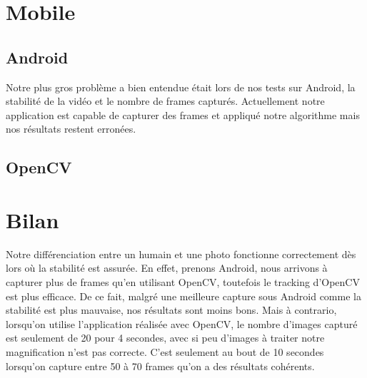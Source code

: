 \section{Mobile}

\subsection{Android}

Notre plus gros problème a bien entendue était lors de nos tests sur Android, la stabilité de la vidéo et le nombre de frames capturés.
Actuellement notre application est capable de capturer des frames et appliqué notre algorithme mais nos résultats restent erronées.

\subsection{OpenCV}


\section{Bilan}

Notre différenciation entre un humain et une photo fonctionne correctement dès lors où la stabilité est assurée. En effet, prenons Android, nous arrivons
à capturer plus de frames qu'en utilisant OpenCV, toutefois le tracking d'OpenCV est plus efficace. De ce fait, malgré une meilleure capture sous Android 
comme la stabilité est plus mauvaise, nos résultats sont moins bons. Mais à contrario, lorsqu'on utilise l'application réalisée avec OpenCV, le nombre d'images
capturé est seulement de 20 pour 4 secondes, avec si peu d'images à traiter notre magnification n'est pas correcte. C'est seulement au bout de 10 secondes
lorsqu'on capture entre 50 à 70 frames qu'on a des résultats cohérents. 

